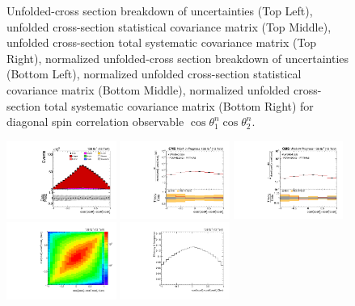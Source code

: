 \begin{figure}[htb]
\begin{center}
\caption{Unfolded-cross section breakdown of uncertainties (Top Left), unfolded cross-section statistical covariance matrix (Top Middle), unfolded cross-section total systematic covariance matrix (Top Right), normalized unfolded-cross section breakdown of uncertainties (Bottom Left), normalized unfolded cross-section statistical covariance matrix (Bottom Middle), normalized unfolded cross-section total systematic covariance matrix (Bottom Right) for diagonal spin correlation observable $\cos\theta_{1}^{n}\cos\theta_{2}^{n}$.}
\label{fig:c_nn_uncertainties}
\end{center}
\end{figure}
\clearpage
\begin{figure}[htb]
\begin{center}
 \includegraphics[width=0.32\textwidth]{fig_fullRun2UL/controlplots/combined/Hyp_LLBarCPrk.pdf}
 \includegraphics[width=0.32\textwidth]{fig_fullRun2UL/unfolding/combined/UnfoldedResults_c_Prk.pdf}
 \includegraphics[width=0.32\textwidth]{fig_fullRun2UL/unfolding/combined/UnfoldedResultsNorm_c_Prk.pdf} \\
 \includegraphics[width=0.32\textwidth]{fig_fullRun2UL/unfolding/combined/ResponseMatrix_c_Prk.pdf}
 \includegraphics[width=0.32\textwidth]{fig_fullRun2UL/unfolding/combined/TotEff_c_Prk.pdf}

\end{center}
\end{figure}

